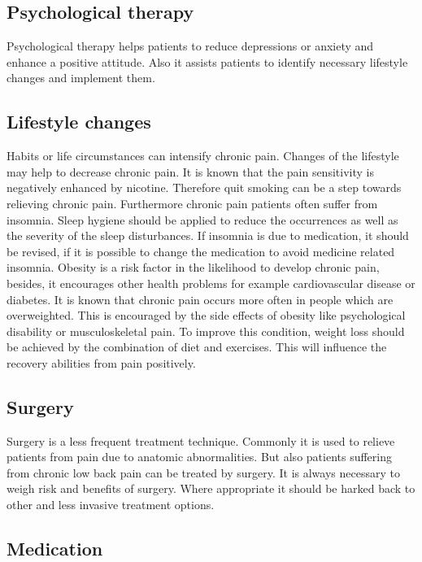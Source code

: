 \subsection{Psychological therapy}

Psychological therapy helps patients to reduce depressions or anxiety and enhance a positive attitude. Also it assists patients to identify necessary lifestyle changes and implement them.

\subsection{Lifestyle changes}

Habits or life circumstances can intensify chronic pain. Changes of the lifestyle may help to decrease chronic pain. It is known that the pain sensitivity is negatively enhanced by nicotine. Therefore quit smoking can be a step towards relieving chronic pain.
Furthermore chronic pain patients often suffer from insomnia. Sleep hygiene should be applied to reduce the occurrences as well as the severity of the sleep disturbances. If insomnia is due to medication, it should be revised, if it is possible to change the medication to avoid medicine related insomnia.
Obesity is a risk factor in the likelihood to  develop chronic pain, besides, it encourages other health problems for example cardiovascular disease or diabetes. It is known that chronic pain occurs more often in people which are overweighted. This is encouraged by the side effects of obesity like psychological disability or musculoskeletal pain. To improve this condition, weight loss should be achieved by the combination of diet and exercises. This will influence the recovery abilities from pain positively. \cite{marcus2009,pope2017}

\subsection{Surgery}

Surgery is a less frequent treatment technique. Commonly it is used to relieve patients from pain due to anatomic abnormalities. \cite{marcus2009,pope2017} But also patients suffering from chronic low back pain can be treated by surgery. It is always necessary to weigh risk and benefits of surgery. Where appropriate it should be harked back to other and less invasive treatment options. \cite{pope2017}

\subsection{Medication}

